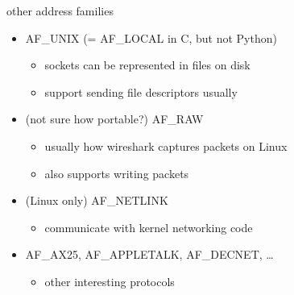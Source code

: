 \begin{frame}{other address families}
    \begin{itemize}
    \item AF\_UNIX {\small (= AF\_LOCAL in C, but not Python)}
        \begin{itemize}
        \item sockets can be represented in files on disk
        \item support sending file descriptors usually
        \end{itemize}
    \item (not sure how portable?) AF\_RAW
        \begin{itemize}
        \item usually how wireshark captures packets on Linux
        \item also supports writing packets
        \end{itemize}
    \item (Linux only) AF\_NETLINK 
        \begin{itemize}
        \item communicate with kernel networking code
        \end{itemize}
    \item AF\_AX25, AF\_APPLETALK, AF\_DECNET, \ldots
        \begin{itemize}
        \item other interesting protocols
        \end{itemize}
    \end{itemize}
\end{frame}
